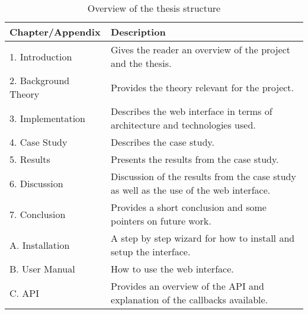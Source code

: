 \begin{table}[!h]
\begin{center}
\begin{tabular}{ | l | p{8cm} |}
\hline
\textbf{Chapter/Appendix} & \textbf{Description} \\ \hline
1. Introduction & Gives the reader an overview of the project and the thesis. \\ \hline
2. Background Theory & Provides the theory relevant for the project. \\ \hline
3. Implementation & Describes the web interface in terms of architecture and technologies used. \\ \hline
4. Case Study & Describes the case study. \\ \hline
5. Results & Presents the results from the case study. \\ \hline
6. Discussion & Discussion of the results from the case study as well as the use of the web interface. \\ \hline
7. Conclusion & Provides a short conclusion and some pointers on future work. \\ \hline
A. Installation & A step by step wizard for how to install and setup the interface. \\ \hline
B. User Manual & How to use the web interface. \\ \hline
C. API & Provides an overview of the API and explanation of the callbacks available. \\ \hline
\end{tabular}
\end{center}
\caption{Overview of the thesis structure}
\label{Tab1}
\end{table}

